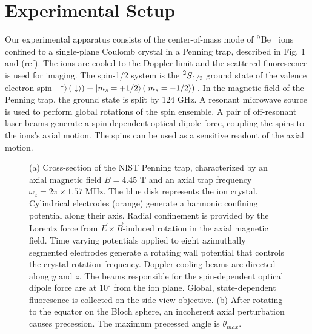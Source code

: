 \documentclass[aps,prl,twocolumn,groupedaddress]{revtex4-1}
\begin{document}
\section{Experimental Setup}
Our experimental apparatus consists of the center-of-mass mode of $\prescript{9}{}{}$Be$^{+}$ ions confined to a single-plane Coulomb crystal in a Penning trap, described in Fig. 1 and (ref). The ions are cooled to the Doppler limit and the scattered fluorescence is used for imaging. The spin-1/2 system is the $\prescript{2}{}{S}_{1/2}$ ground state of the valence electron spin $\ket{\uparrow} (\ket{\downarrow}) \equiv \ket{m_{s}=+1/2} (\ket{m_{s}=-1/2}) $. In the magnetic field of the Penning trap, the ground state is split by 124 GHz. A resonant microwave source is used to perform global rotations of the spin ensemble. A pair of off-resonant laser beams generate a spin-dependent optical dipole force, coupling the spins to the ions's axial motion. The spins can be used as a sensitive readout of the axial motion.
\begin{figure}
  \hfill
  \caption{(a) Cross-section of the NIST Penning trap, characterized by an axial magnetic field $B = 4.45$ T and an axial trap frequency $\omega_z = 2\pi \times 1.57$ MHz. The blue disk represents the ion crystal. Cylindrical electrodes (orange) generate a harmonic confining potential along their axis. Radial confinement is provided by the Lorentz force from $\vec{E} \times \vec{B}$-induced rotation in the axial magnetic field. Time varying potentials applied to eight azimuthally segmented electrodes generate a rotating wall potential that controls the crystal rotation frequency. Doppler cooling beams are directed along $y$ and $z$. The beams responsible for the spin-dependent optical dipole force are at $10^{\circ} $ from the ion plane. Global, state-dependent fluoresence is collected on the side-view objective. (b) After rotating to the equator on the Bloch sphere, an incoherent axial perturbation causes precession. The maximum precessed angle is $\theta_{max}$. }\label{fig:1}
\end{figure}
\end{document}
